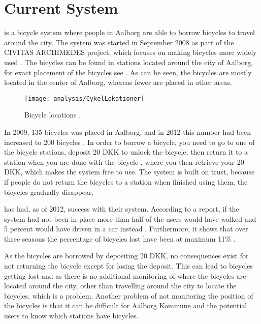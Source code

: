 \section{Current System}\label{sec:currentsystem}


\bycykel is a bicycle system where people in Aalborg are able to borrow bicycles to travel around the city.
The system was started in September 2008 as part of the CIVITAS ARCHIMEDES project, which focuses on making bicycles more widely used \citep{misc:aalborgcykling}.
The bicycles can be found in stations located around the city of Aalborg, for exact placement of the bicycles see .
As can be seen, the bicycles are mostly located in the center of Aalborg, whereas fewer are placed in other areas.

\begin{figure}[h]
	\centering
	\texttt{[image: analysis/CykelLokationer]}
	\caption{Bicycle locations \citep{misc:aalborgbycykel}.}
	\label{fig:CykelLokationer}
\end{figure}

In 2009, 135 bicycles was placed in Aalborg, and in 2012 this number had been increased to 200 bicycles \citep{misc:aalborgcykling}.
In order to borrow a bicycle, you need to go to one of the bicycle stations, deposit 20 DKK to unlock the bicycle, then return it to a station when you are done with the bicycle \citep{misc:aalborgbycykelregler}, where you then retrieve your 20 DKK, which makes the system free to use.
The system is built on trust, because if people do not return the bicycles to a station when finished using them, the bicycles gradually disappear.

\bycykel has had, as of 2012, success with their system. 
According to a report, if the system had not been in place more than half of the users would have walked and 5 percent would have driven in a car instead \citep{misc:aalborgcykling}.
Furthermore, it shows that over three seasons the percentage of bicycles lost have been at maximum 11\% \citep{misc:aalborgcykling}.

As the bicycles are borrowed by depositing 20 DKK, no consequences exist for not returning the bicycle except for losing the deposit.
This can lead to bicycles getting lost and as there is no additional monitoring of where the bicycles are located around the city, other than travelling around the city to locate the bicycles, which is a problem.
Another problem of not monitoring the position of the bicycles is that it can be difficult for Aalborg Kommune and the potential users to know which stations have bicycles.

